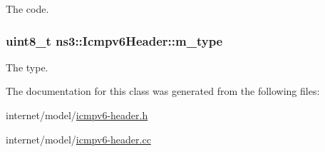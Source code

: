 The code. 

\subsubsection[{\texorpdfstring{m\+\_\+type}{m_type}}]{\setlength{\rightskip}{0pt plus 5cm}uint8\+\_\+t ns3\+::\+Icmpv6\+Header\+::m\+\_\+type\hspace{0.3cm}{\ttfamily [private]}}\hypertarget{classns3_1_1Icmpv6Header_ab8ff041725f233554ea52c49a29ee1a9}{}\label{classns3_1_1Icmpv6Header_ab8ff041725f233554ea52c49a29ee1a9}


The type. 



The documentation for this class was generated from the following files\+:\begin{DoxyCompactItemize}
\item 
internet/model/\hyperlink{icmpv6-header_8h}{icmpv6-\/header.\+h}\item 
internet/model/\hyperlink{icmpv6-header_8cc}{icmpv6-\/header.\+cc}\end{DoxyCompactItemize}
